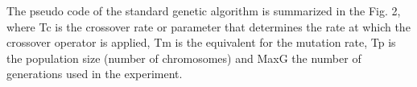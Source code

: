 The pseudo code of the standard genetic algorithm is summarized in the Fig. 2, where Tc is
the crossover rate or parameter that determines the rate at which the crossover operator is
applied, Tm is the equivalent for the mutation rate, Tp is the population size (number of
chromosomes) and MaxG the number of generations used in the experiment.

